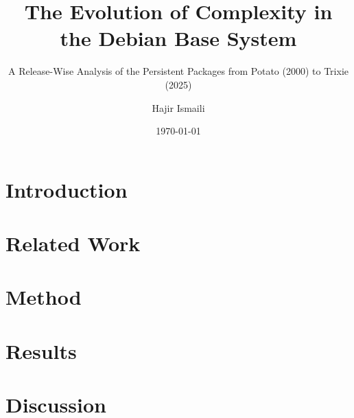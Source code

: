 \documentclass[a4paper, 11pt, DIV=11, abstract=on, listof=leveldown]{scrreprt}
\title{The Evolution of Complexity in the Debian Base System}
\subtitle{A Release-Wise Analysis of the Persistent Packages from Potato (2000) to Trixie (2025)}
\author{Hajir Ismaili}
\date{\today}
\begin{document}

\clearpage

\begin{abstract}

\end{abstract}
\clearpage

\begin{abstract}

\end{abstract}
\clearpage
{}

\renewcommand{\contentsname}{Table of Contents}
\tableofcontents
\clearpage

\listoffigures
\bigskip
\listoftables
\clearpage


\chapter{Introduction}\label{ch:introduction}

\clearpage

\chapter{Related Work}\label{ch:relatedwork}

\clearpage

\chapter{Method}\label{ch:method}

\clearpage

\chapter{Results}\label{ch:results}


\chapter{Discussion}\label{ch:discussion}

\end{document}
